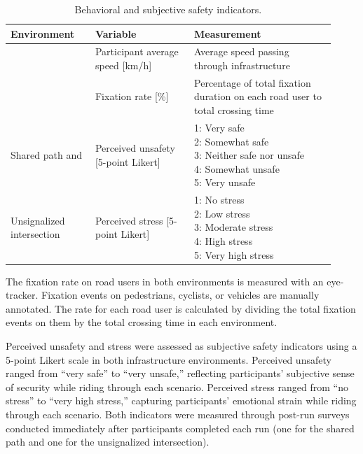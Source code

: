 \documentclass[3p,authoryear]{elsarticle}
\begin{document}
\begin{table}[t]
  \centering
  \caption{Behavioral and subjective safety indicators.}
  \label{tab:indicators}
  \small
  \begin{tabular}{@{}p{0.24\linewidth} p{0.28\linewidth} p{0.40\linewidth}@{}}
    \toprule
    Environment & Variable & Measurement\\
    \midrule
    & Participant average speed [km/h]
      & Average speed passing through infrastructure\\
    \addlinespace[3pt]
    & Fixation rate [\%]
      & Percentage of total fixation duration on each road user to total
        crossing time\\
    \addlinespace[3pt]
    Shared path and
    & Perceived unsafety [5-point Likert]
      & \makecell[tl]{1: Very safe\\ 2: Somewhat safe\\
                      3: Neither safe nor unsafe\\ 4: Somewhat unsafe\\
                      5: Very unsafe}\\
    \addlinespace[3pt]
    Unsignalized intersection
    & Perceived stress [5-point Likert]
      & \makecell[tl]{1: No stress\\ 2: Low stress\\ 3: Moderate stress\\
                      4: High stress\\ 5: Very high stress}\\
    \bottomrule
  \end{tabular}
\end{table}

The fixation rate on road users in both environments is measured with an
eye-tracker. Fixation events on pedestrians, cyclists, or vehicles are manually
annotated. The rate for each road user is calculated by dividing the total
fixation events on them by the total crossing time in each environment.

Perceived unsafety and stress were assessed as subjective safety indicators
using a 5-point Likert scale in both infrastructure environments. Perceived
unsafety ranged from ``very safe'' to ``very unsafe,'' reflecting participants'
subjective sense of security while riding through each scenario. Perceived
stress ranged from ``no stress'' to ``very high stress,'' capturing participants'
emotional strain while riding through each scenario. Both indicators were
measured through post-run surveys conducted immediately after participants
completed each run (one for the shared path and one for the unsignalized
intersection).
\end{document}
